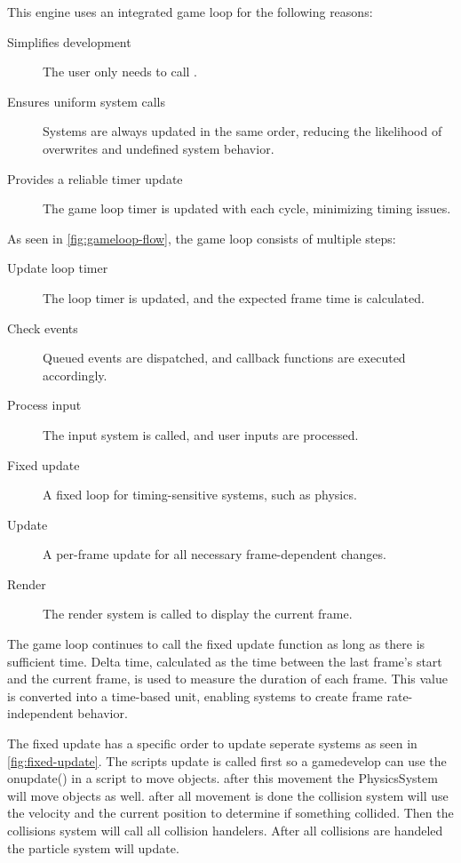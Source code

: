 \documentclass{projdoc}
\begin{document}
This engine uses an integrated game loop for the following reasons:\noparbreak
\begin{description}
	\item[Simplifies development] The user only needs to call .
	\item[Ensures uniform system calls] Systems are always updated in the same order,
		reducing the likelihood of overwrites and undefined system behavior.
	\item[Provides a reliable timer update] The game loop timer is updated with each
		cycle, minimizing timing issues.
\end{description}

As seen in \cref{fig:gameloop-flow}, the game loop consists of multiple
steps:\noparbreak
\begin{description}
	\item[Update loop timer] The loop timer is updated, and the expected frame time is
		calculated.
	\item[Check events] Queued events are dispatched, and callback functions are
		executed accordingly.
	\item[Process input] The input system is called, and user inputs are processed.
	\item[Fixed update] A fixed loop for timing-sensitive systems, such as physics.
	\item[Update] A per-frame update for all necessary frame-dependent changes.
	\item[Render] The render system is called to display the current frame.
\end{description}

The game loop continues to call the fixed update function as long as there is
sufficient time. Delta time, calculated as the time between the last frame’s start
and the current frame, is used to measure the duration of each frame. This value is
converted into a time-based unit, enabling systems to create frame rate-independent
behavior.

The fixed update has a specific order to update seperate systems as seen in
\cref{fig:fixed-update}. The scripts update is called first so a gamedevelop can use
the onupdate() in a script to move objects. after this movement the PhysicsSystem
will move objects as well. after all movement is done the collision system will use
the velocity and the current position to determine if something collided. Then the
collisions system will call all collision handelers. After all collisions are
handeled the particle system will update.
\end{document}
